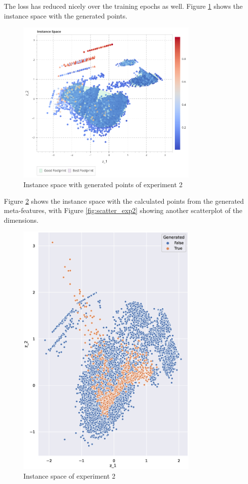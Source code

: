 The loss has reduced nicely over the training epochs as well. Figure \ref{fig:is_gen_points2} shows the instance space with the generated points. 

\begin{figure}[H]
    \centering
    \includegraphics[width=0.8\textwidth]{Cap5/is_exp2}
    \caption{Instance space with generated points of experiment 2}
    \label{fig:is_gen_points2}
\end{figure}


Figure \ref{fig:is_exp2} shows the instance space with the calculated points from the generated meta-features, with Figure \ref{fig:scatter_exp2} showing another scatterplot of the dimensions.

\begin{figure}[H]
    \centering
    \includegraphics[width=0.8\textwidth]{Cap5/all_coords2.eps}
    \caption{Instance space of experiment 2}
    \label{fig:is_exp2}
\end{figure}

